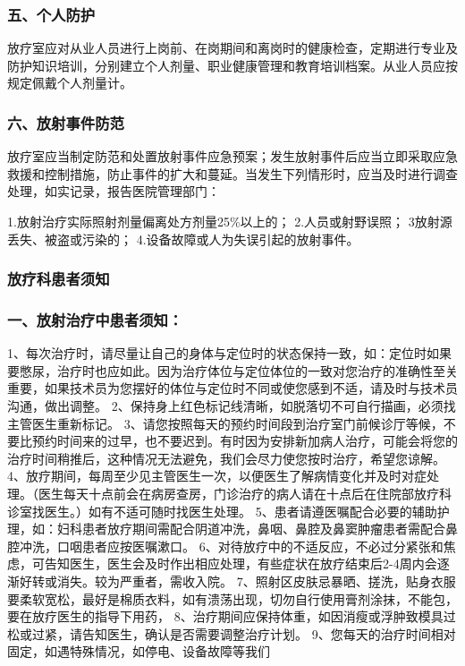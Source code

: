 \subsubsection{五、个人防护}

放疗室应对从业人员进行上岗前、在岗期间和离岗时的健康检查，定期进行专业及防护知识培训，分别建立个人剂量、职业健康管理和教育培训档案。从业人员应按规定佩戴个人剂量计。

\subsubsection{六、放射事件防范}

放疗室应当制定防范和处置放射事件应急预案；发生放射事件后应当立即采取应急救援和控制措施，防止事件的扩大和蔓延。当发生下列情形时，应当及时进行调查处理，如实记录，报告医院管理部门：

1.放射治疗实际照射剂量偏离处方剂量25\%以上的；
2.人员或射野误照；
3放射源丢失、被盗或污染的；
4.设备故障或人为失误引起的放射事件。

\subsubsection{放疗科患者须知}

\subsubsection{一、放射治疗中患者须知：}

1、每次治疗时，请尽量让自己的身体与定位时的状态保持一致，如：定位时如果要憋尿，治疗时也应如此。因为治疗体位与定位体位的一致对您治疗的准确性至关重要，如果技术员为您摆好的体位与定位时不同或使您感到不适，请及时与技术员沟通，做出调整。
2、保持身上红色标记线清晰，如脱落切不可自行描画，必须找主管医生重新标记。
3、请您按照每天的预约时间段到治疗室门前候诊厅等候，不要比预约时间来的过早，也不要迟到。有时因为安排新加病人治疗，可能会将您的治疗时间稍推后，这种情况无法避免，我们会尽力使您按时治疗，希望您谅解。
4、放疗期间，每周至少见主管医生一次，以便医生了解病情变化并及时对症处理。（医生每天十点前会在病房查房，门诊治疗的病人请在十点后在住院部放疗科诊室找医生。）如有不适可随时找医生处理。
5、患者请遵医嘱配合必要的辅助护理，如：妇科患者放疗期间需配合阴道冲洗，鼻咽、鼻腔及鼻窦肿瘤患者需配合鼻腔冲洗，口咽患者应按医嘱漱口。
6、对待放疗中的不适反应，不必过分紧张和焦虑，可告知医生，医生会及时作出相应处理，有些症状在放疗结束后2-4周内会逐渐好转或消失。较为严重者，需收入院。
7、照射区皮肤忌暴晒、搓洗，贴身衣服要柔软宽松，最好是棉质衣料，如有溃荡出现，切勿自行使用膏剂涂抹，不能包，要在放疗医生的指导下用药，
8、治疗期间应保持体重，如因消瘦或浮肿致模具过松或过紧，请告知医生，确认是否需要调整治疗计划。
9、您每天的治疗时间相对固定，如遇特殊情况，如停电、设备故障等我们

